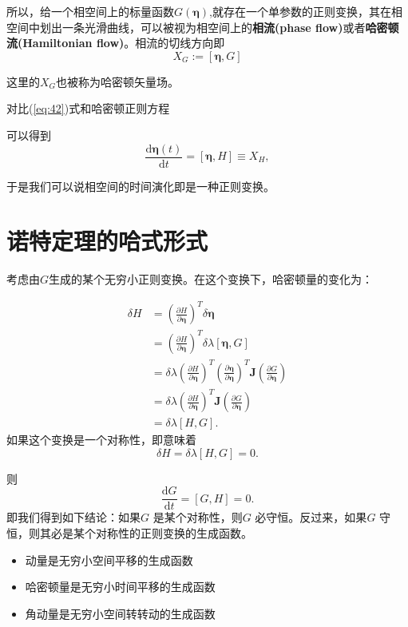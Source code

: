 \documentclass[12pt]{ctexart}
\begin{document}
所以，给一个相空间上的标量函数$G\left(\boldsymbol{\eta}\right)$,就存在一个单参数的正则变换，其在相空间中划出一条光滑曲线，可以被视为相空间上的\textbf{相流(phase flow)}或者\textbf{哈密顿流(Hamiltonian flow)}。相流的切线方向即
\begin{equation}X_G:=[\boldsymbol{\eta},G]
\end{equation}


这里的$X_G$也被称为哈密顿矢量场。

对比(\ref{eq:42})式和哈密顿正则方程

可以得到
$$\frac{\mathrm{d}\boldsymbol{\eta}\left(t\right)}{\mathrm{d}t}=[\boldsymbol{\eta},H]\equiv X_H,$$

于是我们可以说相空间的时间演化即是一种正则变换。
\section{诺特定理的哈式形式}
考虑由$G$生成的某个无穷小正则变换。在这个变换下，哈密顿量的变化为：


 \begin{equation}
        \begin{aligned}
            \delta H &= \left(\frac{\partial H}{\partial\boldsymbol{\eta}}\right)^T\delta \boldsymbol{\eta}\\
            &= \left(\frac{\partial H}{\partial\boldsymbol{\eta}}\right)^T\delta\lambda\left[\boldsymbol\eta,G\right]\\
            &= \delta\lambda \left(\frac{\partial H}{\partial\boldsymbol{\eta}}\right)^T \left(\frac{\partial \boldsymbol{\boldsymbol{\eta}}}{\partial \boldsymbol{\eta}}\right)^T \boldsymbol{J} \left(\frac{\partial G}{\partial \boldsymbol{\eta}}\right)\\
            &=\delta\lambda \left(\frac{\partial H}{\partial\boldsymbol{\eta}}\right)^T  \boldsymbol{J} \left(\frac{\partial G}{\partial \boldsymbol{\eta}}\right)\\
            &= \delta\lambda\left[H,G\right].
        \end{aligned}
        \label{eq:43}
\end{equation}
    如果这个变换是一个对称性，即意味着
\begin{equation}
    \delta H=\delta\lambda[H,G]=0.
\end{equation}

则
\begin{equation}
    \frac{\mathrm{d}G}{\mathrm{d}t}=[G,H]=0.
\end{equation}
即我们得到如下结论：如果$G$ 是某个对称性，则$G$ 必守恒。反过来，如果$G$ 守恒，则其必是某个对称性的正则变换的生成函数。
\begin{itemize}
    \item 动量是无穷小空间平移的生成函数
    \item 哈密顿量是无穷小时间平移的生成函数
    \item 角动量是无穷小空间转转动的生成函数
\end{itemize}
\end{document}
